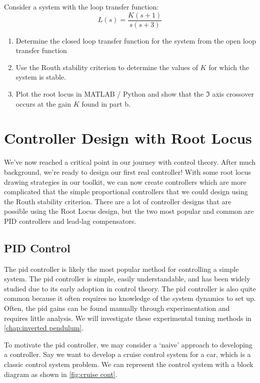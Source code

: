 \begin{exercise}
Consider a system with the loop transfer function:
$$L(s)=\frac{K(s+1)}{s(s+3)}$$
\begin{enumerate}[label=\alph*)]
\item Determine the closed loop transfer function for the system from the open loop transfer function
\item Use the Routh stability criterion to determine the values of $K$ for which the system is stable.
\item Plot the root locus in MATLAB / Python and show that the $\Im$ axis crossover occurs at the gain $K$ found in part b.
\end{enumerate}
\end{exercise}

\section{Controller Design with Root Locus}
We've now reached a critical point in our journey with control theory. After much background, we're ready to design our first real controller! With some root locus drawing strategies in our toolkit, we can now create controllers which are more complicated that the simple proportional controllers that we could design using the Routh stability criterion. There are a lot of controller designs that are possible using the Root Locus design, but the two most popular and common are PID controllers and lead-lag compensators.

\subsection{PID Control}
The \gls{pid} controller is likely the most popular method for controlling a simple system. The \gls{pid} controller is simple, easily understandable, and has been widely studied due to its early adoption in control theory. The \gls{pid} controller is also quite common because it often requires no knowledge of the system dynamics to set up. Often, the \gls{pid} gains can be found manually through experimentation and requires little analysis. We will investigate these experimental tuning methods in \autoref{chap:inverted pendulum}.

To motivate the \gls{pid} controller, we may consider a `naive' approach to developing a controller. Say we want to develop a cruise control system for a car, which is a classic control system problem. We can represent the control system with a block diagram as shown in \autoref{fig:cruise cont}.

